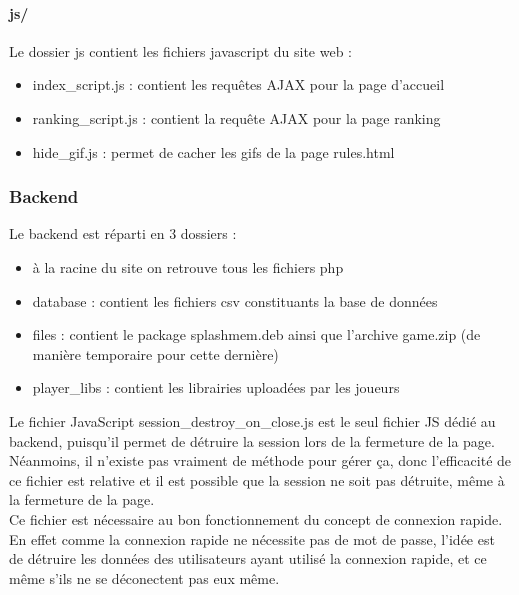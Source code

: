 \documentclass[12pt, openany]{article}
\begin{document}
	\paragraph {js/}
	Le dossier js contient les fichiers javascript du site web :
	\begin{itemize}[label=$-$]
		\item index\_script.js : contient les requêtes AJAX pour la page d'accueil\\
		\item ranking\_script.js : contient la requête AJAX pour la page ranking\\
		\item hide\_gif.js : permet de cacher les gifs de la page rules.html\\
	\end{itemize}

	\subsubsection{Backend}
	Le backend est réparti en 3 dossiers :
	\begin{itemize}[label=$-$]
		\item à la racine du site on retrouve tous les fichiers php\\
		\item database : contient les fichiers csv constituants la base de données\\
		\item files : contient le package splashmem.deb ainsi que l'archive game.zip (de manière temporaire pour cette dernière)\\
		\item player\_libs : contient les librairies uploadées par les joueurs\\
	\end{itemize}

	Le fichier JavaScript session\_destroy\_on\_close.js est le seul fichier JS dédié au backend, puisqu'il permet de détruire la session lors de la fermeture de la page. Néanmoins, il n'existe pas vraiment de méthode pour gérer ça, donc l'efficacité de ce fichier est relative et il est possible que la session ne soit pas détruite, même à la fermeture de la page.\\
	Ce fichier est nécessaire au bon fonctionnement du concept de connexion rapide. En effet comme la connexion rapide ne nécessite pas de mot de passe, l'idée est de détruire les données des utilisateurs ayant utilisé la connexion rapide, et ce même s'ils ne se déconectent pas eux même.\\
\end{document}
